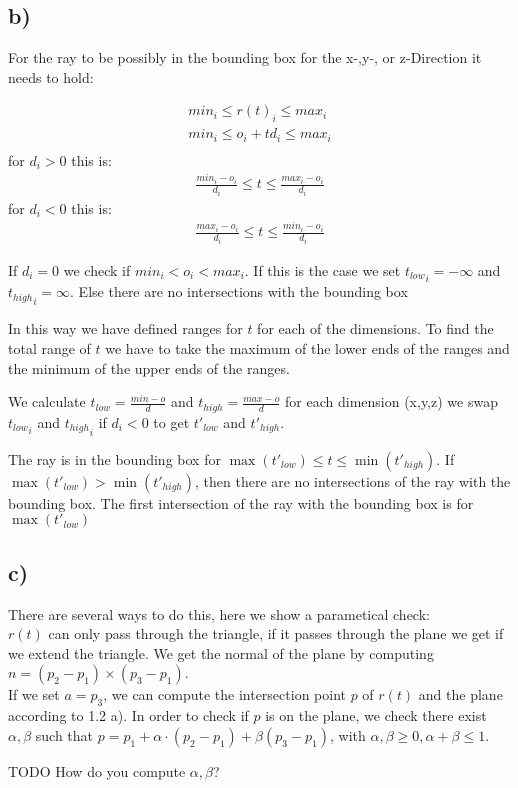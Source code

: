 \documentclass[a4paper]{scrartcl}
\begin{document}
    \subsection*{b)}
        For the ray to be possibly in the bounding box for the x-,y-, or z-Direction it needs to hold:
            
        \begin{align*}{}
          min_i \leq r(t)_i \leq max_i \\
          min_i \leq o_i + t d_i \leq max_i \\
        \end{align*}
        for $d_i > 0$ this is:
        \begin{align*}
          \frac{min_i - o_i}{d_i} \leq t \leq \frac{max_i - o_i}{d_i}          
        \end{align*} 
        for $d_i < 0$ this is:
        \begin{align*}
          \frac{max_i - o_i}{d_i} \leq t \leq \frac{min_i - o_i}{d_i}          
        \end{align*} 

        If $d_i = 0$ we check if $min_i < o_i < max_i$. If this is the case we set 
        ${t_{low}}_i = -\infty$ and ${t_{high}}_i = \infty$. Else there are no intersections with the bounding box
        
        In this way we have defined ranges for $t$ for each of the dimensions. 
        To find the total range of $t$ we have to take the maximum of the lower ends of the 
        ranges and the minimum of the upper ends of the ranges.

        We calculate $t_{low} = \frac{min - o}{d}$ and $t_{high} = \frac{max - o}{d}$
        for each dimension (x,y,z) we swap ${t_{low}}_i$ and ${t_{high}}_i$ if $d_i < 0$ to get $t'_{low}$ and $t'_{high}$.
        
        The ray is in the bounding box for $\max(t'_{low}) \leq t \leq \min(t'_{high})$. If $\max(t'_{low}) > \min(t'_{high})$, then
        there are no intersections of the ray with the bounding box. The first intersection of the ray with the bounding box is for 
        $\max(t'_{low})$


    \subsection*{c)}
        There are several ways to do this, here we show a parametical check:\\
        $r(t)$ can only pass through the triangle, if it passes through the
        plane we get if we extend the triangle. We get the normal of the plane
        by computing $n=(p_2 - p_1)\times (p_3 - p_1)$.\\
        If we set $a=p_3$, we can compute the intersection point $p$ of $r(t)$
        and the plane according to 1.2 a). In order to check if $p$ is on the
        plane, we check there exist $\alpha , \beta$ such that $p=p_1 + \alpha
        \cdot (p_2 - p_1 ) + \beta (p_3 - p_1 )$, with $\alpha , \beta \geq 0,
        \alpha + \beta \leq 1$.

        TODO How do you compute $\alpha, \beta$?
\end{document}
